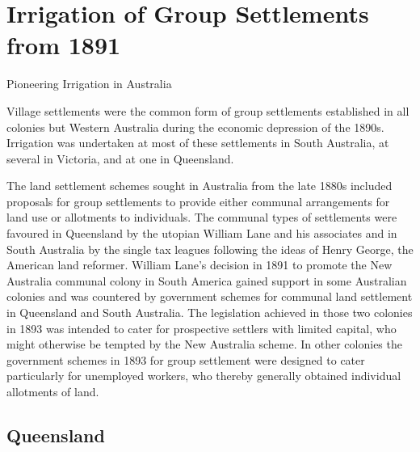 
\setcounter{endnote}{0}

\chapter{Irrigation of Group Settlements from 1891}
\label{ch:groups}
%
{Pioneering Irrigation in Australia}

Village settlements were the common form of group settlements
established in all colonies but Western Australia during the economic
depression of the 1890s.  Irrigation was undertaken at most of these
settlements in South Australia, at several in Victoria, and at one in
Queensland.

The land settlement schemes sought in Australia from the late 1880s
included proposals for group settlements to provide either communal
arrangements for land use or allotments to individuals.  The communal
types of settlements were favoured in Queensland by the utopian
William Lane and his associates and in South Australia by the single
tax leagues following the ideas of Henry George, the American land
reformer.  William Lane's decision in 1891 to promote the New
Australia communal colony in South America gained support in some
Australian colonies and was countered by government schemes for
communal land settlement in Queensland and South Australia.  The
legislation achieved in those two colonies in 1893 was intended to
cater for prospective settlers with limited capital, who might
otherwise be tempted by the New Australia scheme.  In other colonies
the government schemes in 1893 for group settlement were designed to
cater particularly for unemployed workers, who thereby generally
obtained individual allotments of land.

\section*{Queensland}

